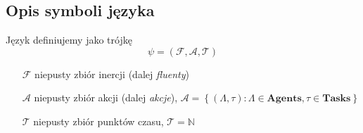 \subsection{Opis symboli języka}
\begin{definition}
Język definiujemy jako trójkę
\begin{equation}
\psi = \left( \mathcal{F}, \mathcal{A}, \mathcal{T} \right)
\end{equation}
\begin{itemize}
\item[$\mathcal{F}$] niepusty zbiór inercji (dalej \emph{fluenty})
\item[$\mathcal{A}$] niepusty zbiór akcji (dalej \emph{akcje}), 
$\mathcal{A} = \left\lbrace (\Lambda, \tau) : \Lambda \in \textbf{Agents}, \tau \in \textbf{Tasks} \right\rbrace$
\item[$\mathcal{T}$] niepusty zbiór punktów czasu, $\mathcal{T} = \mathbb{N}$
\end{itemize}
\end{definition}

